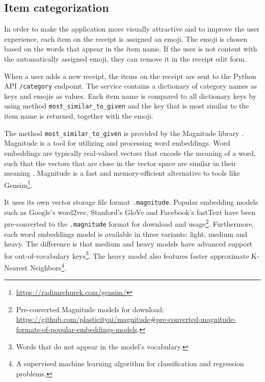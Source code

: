 \documentclass[
  printed, %
  table,   %
  oneside, %
  lof,     %
  lot,     %
]{fithesis3}
\DeclareRobustCommand{\thinskip}{\hskip 0.16667em\relax}
\def\emdash{---}
\def\dosh#1#2{\unskip#1\thinskip#2\thinskip\ignorespaces}
\def\Dash{\dosh\nobreak\emdash}
\begin{document}

\subsection{Item categorization}
In order to make the application more visually attractive and to improve the user experience, each item on the receipt is assigned an emoji. The emoji is chosen based on the words that appear in the item name. If the user is not content with the automatically assigned emoji, they can remove it in the receipt edit form.

When a user adds a new receipt, the items on the receipt are sent to the Python API \texttt{/category} endpoint. The service contains a dictionary of category names as keys and emojis as values. Each item name is compared to all dictionary keys by using method \texttt{most\_similar\_to\_given} and the key that is most similar to the item name is returned, together with the emoji.

The method \texttt{most\_similar\_to\_given} is provided by the Magnitude library \cite{PatelEtal2018Magnitude}. Magnitude is a tool for utilizing and processing word embeddings. Word embeddings are typically real-valued vectors that encode the meaning of a word, such that the vectors that are close in the vector space are similar in their meaning \cite{Jurafsky2020Speech}. Magnitude is a fast and memory-efficient alternative to tools like Gensim\footnote{\url{https://radimrehurek.com/gensim/}}.

It uses its own vector storage file format \texttt{.magnitude}.
Popular embedding models such as Google's word2vec, Stanford's GloVe and Facebook's fastText have been pre-converted to the \texttt{.magnitude} format for download and usage\footnote{Pre-converted Magnitude models for download:\\\url{https://github.com/plasticityai/magnitude\#pre-converted-magnitude-formats-of-popular-embeddings-models}.}. Furthermore, each word embeddings model is available in three variants: light, medium and heavy. The difference is that medium and heavy models have advanced support for out-of-vocabulary keys\footnote{Words that do not appear in the model's vocabulary.}. The heavy model also features faster approximate K-Nearest Neighbors\footnote{A supervised machine learning algorithm for classification and regression problems.}.
\end{document}
